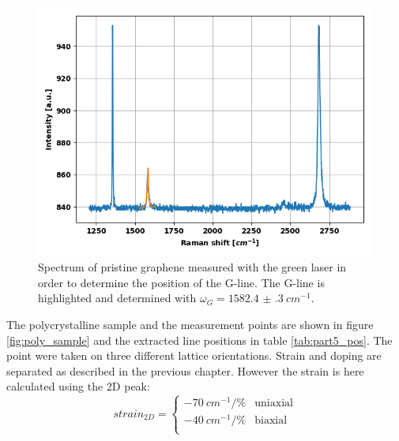 \documentclass[12pt,a4paper]{article}
\begin{document}
\begin{figure}
\centering
\includegraphics[scale=0.5]{Bilder/part6/prestine_green.png}
\caption{Spectrum of pristine graphene measured with the green laser in order to determine the position of the G-line. The G-line is highlighted and determined with $\omega_{G} = \SI{1582.4(3)}{cm^{-1}}$.}
\label{fig:pristine_green}
\end{figure}

The polycrystalline sample and the measurement points are shown in figure  \ref{fig:poly_sample} and the extracted line positions in table \ref{tab:part5_pos}. The point were taken on three different lattice orientations. Strain and doping are separated as described in the previous chapter. However the strain is here calculated using the 2D peak:
\begin{equation*}
  strain_{2D} = \begin{cases}
        \SI{-70}{cm^{-1}/\%} &\text{uniaxial} \\
        \SI{-40}{cm^{-1}/\%} &\text{biaxial} \\
        \end{cases}
\end{equation*}
\end{document}
